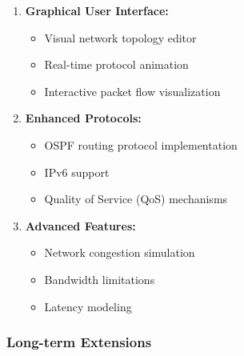 \documentclass[12pt,a4paper]{article}
\begin{document}
\begin{enumerate}
\item \textbf{Graphical User Interface:} 
   \begin{itemize}
   \item Visual network topology editor
   \item Real-time protocol animation
   \item Interactive packet flow visualization
   \end{itemize}

\item \textbf{Enhanced Protocols:}
   \begin{itemize}
   \item OSPF routing protocol implementation
   \item IPv6 support
   \item Quality of Service (QoS) mechanisms
   \end{itemize}

\item \textbf{Advanced Features:}
   \begin{itemize}
   \item Network congestion simulation
   \item Bandwidth limitations
   \item Latency modeling
   \end{itemize}
\end{enumerate}

\subsubsection{Long-term Extensions}
\end{document}
